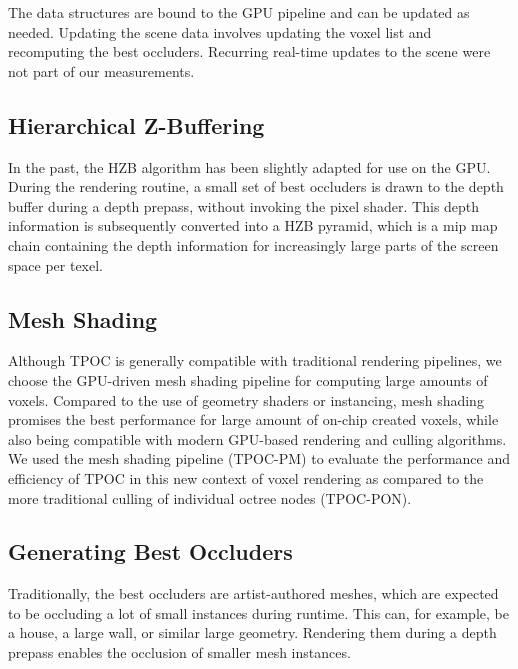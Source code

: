 \documentclass[conference]{IEEEtran}
\begin{document}
\noindent
The data structures are bound to the \ac{GPU} pipeline and can be updated as needed. Updating the scene data 
involves updating the voxel list and recomputing the best occluders. Recurring real-time updates to the 
scene were not part of our measurements.

\subsection{Hierarchical Z-Buffering}

\noindent
In the past, the \ac{HZB} algorithm has been slightly adapted for use on the \ac{GPU}. During the rendering 
routine, a small set of best occluders is drawn to the depth buffer during a depth prepass, without invoking 
the pixel shader. This depth information is subsequently converted into a \ac{HZB} pyramid, which is a mip 
map chain containing the depth information for increasingly large parts of the screen space per texel. \\


\subsection{Mesh Shading}

\noindent
Although \ac{TPOC} is generally compatible with traditional rendering pipelines, we choose the 
\ac{GPU}-driven mesh shading pipeline for computing large amounts of voxels. Compared to the use 
of geometry shaders or instancing, mesh shading promises the best performance for large amount 
of on-chip created voxels, while also being compatible with modern \ac{GPU}-based rendering and 
culling algorithms. \\

\noindent
We used the mesh shading pipeline (\ac{TPOC-PM}) to evaluate the performance and efficiency of 
\ac{TPOC} in this new context of voxel rendering as compared to the more traditional culling of 
individual octree nodes (\ac{TPOC-PON}). 

\subsection{Generating Best Occluders} \label{sec-gen-best-occluders}

\noindent
Traditionally, the best occluders are artist-authored meshes, which are expected to be occluding a lot 
of small instances during runtime. This can, for example, be a house, a large wall, or similar large 
geometry. Rendering them during a depth prepass enables the occlusion of smaller mesh instances. \\
\end{document}
